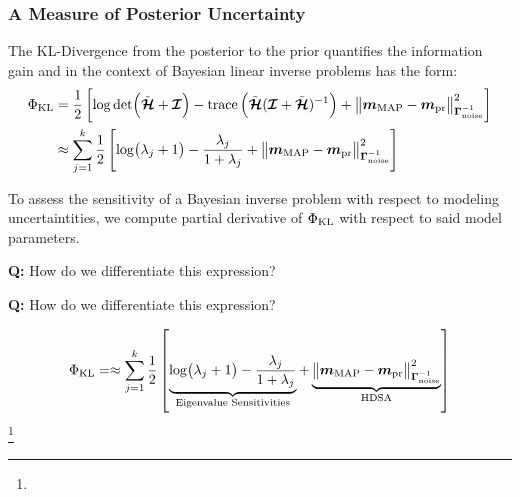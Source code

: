 \documentclass[
  pdf,
  10pt,
  xcolor={svgnames},
]{beamer}
\newcommand\blfootnote[1]{%
  \begingroup
  \renewcommand\thefootnote{}\footnote{\scriptsize #1}%
  \addtocounter{footnote}{-1}%
  \endgroup
}
\newcommand{\mcb}[1]{\boldsymbol{\mathcal{#1}}}
\renewcommand{\vec}[1]{{\mathchoice
                     {\mbox{\boldmath$\displaystyle{#1}$}}
                     {\mbox{\boldmath$\textstyle{#1}$}}
                     {\mbox{\boldmath$\scriptstyle{#1}$}}
                     {\mbox{\boldmath$\scriptscriptstyle{#1}$}}}}
\newcommand{\mat}[1]{\mathbf{{#1}}}
\begin{document}
\begin{frame}
  \frametitle{A Measure of Posterior Uncertainty}
  \begin{definition}
    The KL-Divergence from the posterior to the prior quantifies the information
    gain and in the context of Bayesian linear inverse problems has the form:
    \begin{align*}
      \Phi_{\rm KL}
       & =
      \frac{1}{2}\left[
      \log\det(\tilde{\mcb{H}} + \mcb{I})
      - {\rm trace}\left(
      \tilde{\mcb{H}}(\mcb{I} + \tilde{\mcb{H}})^{-1}
      \right)
      + \norm{
        \vec{m}_{\rm MAP} - \vec{m}_{\rm pr}
      }_{\mat{\Gamma}_{\rm noise}^{-1}}^2
      \right]    \\
       & \approx
      \sum_{j=1}^k
      \frac{1}{2}\left[
      \log(\lambda_j + 1)
      - \frac{\lambda_j}{1+\lambda_j}
      + {\norm{
        \vec{m}_{\rm MAP} - \vec{m}_{\rm pr}
      }_{\mat{\Gamma}_{\rm noise}^{-1}}^2}
      \right]
    \end{align*}
  \end{definition}
  \pause
  To assess the sensitivity of a Bayesian inverse problem with respect to
  modeling uncertaintities, we compute partial derivative of $\Phi_{\rm KL}$
  with respect to said model parameters.
  \pause
  \begin{alertblock}{}
    \begin{center}
      {\bf Q:} How do we differentiate this expression?
    \end{center}
  \end{alertblock}
\end{frame}
\begin{frame}
  \begin{alertblock}{}
    \begin{center}
      {\bf Q:} How do we differentiate this expression?
    \end{center}
  \end{alertblock}
  \[
    \Phi_{\rm KL}
    = \approx
    \sum_{j=1}^k
    \frac{1}{2}\left[
      \underbrace{
        \log(\lambda_j + 1)
        - \frac{\lambda_j}{1+\lambda_j}
      }_{\text{Eigenvalue Sensitivities}}
      + \underbrace{
        \norm{
          \vec{m}_{\rm MAP} - \vec{m}_{\rm pr}
        }_{\mat{\Gamma}_{\rm noise}^{-1}}^2
      }_{\text{HDSA}}
      \right]
  \]
  \blfootnote{}
\end{frame}

\end{document}
